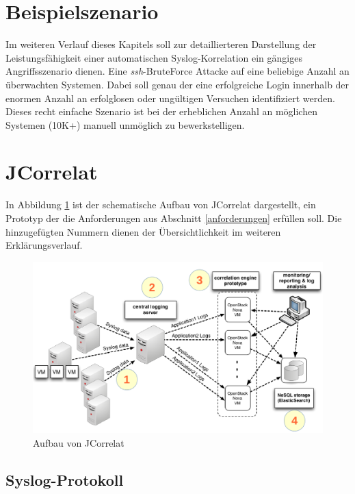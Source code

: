 \section{Beispielszenario}\label{szenario}

Im weiteren Verlauf dieses Kapitels soll zur detaillierteren Darstellung der 
Leistungsfähigkeit einer automatischen Syslog-Korrelation ein gängiges 
Angriffsszenario dienen. Eine \textit{ssh}-BruteForce Attacke auf eine beliebige Anzahl
an überwachten Systemen. Dabei soll genau der eine erfolgreiche Login innerhalb  der 
enormen Anzahl an erfolglosen oder ungültigen Versuchen identifiziert werden. Dieses 
recht einfache Szenario ist bei der erheblichen Anzahl an möglichen Systemen (10K+) 
manuell unmöglich zu bewerkstelligen.

\newpage
\section{JCorrelat}\label{sec_jcorrelat}

In Abbildung \ref{pic:jcorrelat} \cite[47]{reissmann} ist der schematische Aufbau von 
JCorrelat dargestellt, ein Prototyp der die Anforderungen aus Abschnitt 
\ref{anforderungen} erfüllen soll. Die hinzugefügten Nummern dienen der Übersichtlichkeit 
im weiteren Erklärungsverlauf.   

\begin{figure}[htbp]
    \caption{Aufbau von JCorrelat}
    \label{pic:jcorrelat}\vspace{0.2cm}
    \centering
    \includegraphics[scale=0.36]{img/schema-correlat}
    
\end{figure}

\subsection{Syslog-Protokoll} \label{syslog-proto}

